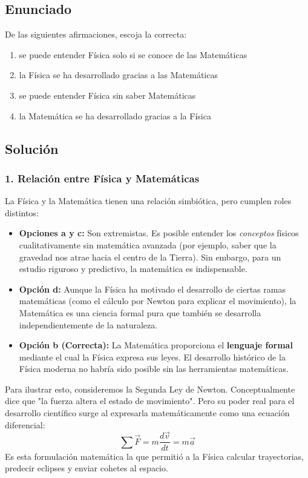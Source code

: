 \documentclass[12pt, a4paper]{article}
\begin{document}
\subsection*{Enunciado}
De las siguientes afirmaciones, escoja la correcta:
\begin{enumerate}[label=\alph*)]
    \item se puede entender Física solo si se conoce de las Matemáticas
    \item la Física se ha desarrollado gracias a las Matemáticas
    \item se puede entender Física sin saber Matemáticas
    \item la Matemática se ha desarrollado gracias a la Física
\end{enumerate}

\subsection*{Solución}

\subsubsection*{1. Relación entre Física y Matemáticas}
La Física y la Matemática tienen una relación simbiótica, pero cumplen roles distintos:
\begin{itemize}
    \item \textbf{Opciones a y c:} Son extremistas. Es posible entender los \textit{conceptos} físicos cualitativamente sin matemática avanzada (por ejemplo, saber que la gravedad nos atrae hacia el centro de la Tierra). Sin embargo, para un estudio riguroso y predictivo, la matemática es indispensable.
    \item \textbf{Opción d:} Aunque la Física ha motivado el desarrollo de ciertas ramas matemáticas (como el cálculo por Newton para explicar el movimiento), la Matemática es una ciencia formal pura que también se desarrolla independientemente de la naturaleza.
    \item \textbf{Opción b (Correcta):} La Matemática proporciona el \textbf{lenguaje formal} mediante el cual la Física expresa sus leyes. El desarrollo histórico de la Física moderna no habría sido posible sin las herramientas matemáticas. 
\end{itemize}

Para ilustrar esto, consideremos la Segunda Ley de Newton. Conceptualmente dice que "la fuerza altera el estado de movimiento". Pero su poder real para el desarrollo científico surge al expresarla matemáticamente como una ecuación diferencial:
$$ \sum \vec{F} = m \frac{d\vec{v}}{dt} = m \vec{a} $$
Es esta formulación matemática la que permitió a la Física calcular trayectorias, predecir eclipses y enviar cohetes al espacio.
\end{document}
